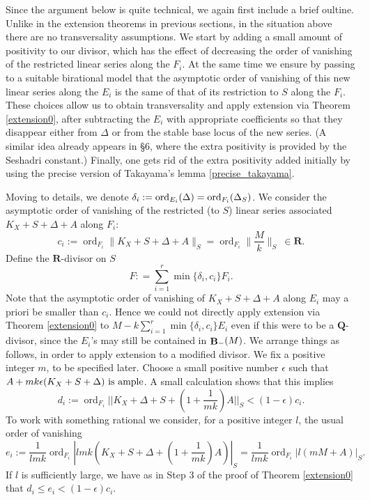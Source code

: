 \documentclass[11pt]{amsart}
\theoremstyle{plain}
\theoremstyle{definition}
\newcommand{\RR}{\mathbf{R}}
\newcommand{\QQ}{\mathbf{Q}}
\DeclareMathOperator{\ord}{ord}
\DeclareMathOperator{\BB}{{\bf B}}
\begin{document}
Since the argument below is quite  technical, we again first include a brief oultine. Unlike in the extension theorems in previous sections, in the situation above
there are no transversality assumptions. We start by adding a small amount of positivity to our divisor, which has the effect of decreasing the order 
of vanishing of the restricted linear series along the $F_i$. At the same time we ensure by passing to a suitable birational model that the 
asymptotic order of vanishing of this new linear series along the $E_i$ is the same of that  of its restriction to $S$ along the $F_i$. These choices allow us to 
obtain transversality and apply extension via Theorem \ref{extension0}, after subtracting the $E_i$ with appropriate coefficients so that they disappear either from 
$\Delta$ or from the stable base locus of the new series. (A similar idea already appears in \cite{el1} \S6,  where the extra positivity is provided by the Seshadri constant.)
Finally, one gets rid of the extra positivity added initially by using the precise version of Takayama's lemma \ref{precise_takayama}.


Moving to details, we denote $\delta_i : = {\rm ord}_{E_i} (\Delta) = {\rm ord}_{F_i} (\Delta_S)$.
We consider the asymptotic order of vanishing of the restricted (to $S$) linear series associated $K_X + S + \Delta + A$ along $F_i$:
$$c_i := \ord_{F_i} \parallel K_X + S + \Delta + A \parallel_S =  \ord_{F_i} \parallel \frac{M}{k} \parallel_S ~\in \RR.$$
Define the $\RR$-divisor on $S$
$$F: =  \sum_{i=1}^r \min \{\delta_i, c_i\} F_i.$$
Note that the asymptotic order of vanishing of $K_X +  S + \Delta + A$ along $E_i$ may 
a priori be smaller than $c_i$. Hence we could not directly apply extension via Theorem \ref{extension0} to $M - k \sum_{i=1}^r \min \{\delta_i, c_i\} E_i$ even if this were to be a 
$\QQ$-divisor, since the $E_i$'s may still be contained in $\BB_{-} (M)$. We arrange things as  follows, in order to apply extension to a modified divisor. We fix a positive integer $m$, to be specified  later. Choose a small positive 
number $\epsilon$ such that $A + mk\epsilon  (K_X +S + \Delta) {\rm~is ~ample}$.
A small calculation shows that this implies 
$$d_i := \ord_{F_i} ||K_X+\Delta +S +(1+\frac{1}{mk})A||_S < (1-\epsilon)c_i.$$
To work with something rational we consider, for a positive integer $l$, the usual order 
of vanishing
$$e_i :=\frac{1}{lmk}\ord_{F_i} |lmk(K_X+S+\Delta +(1+\frac{1}{mk}) A)|_S = 
\frac{1}{lmk}\ord_{F_i} |l(mM  + A)|_S.$$
If $l$ is sufficiently large, we have as in Step 3 of the proof of Theorem \ref{extension0}
that $d_i \le e_i < (1 - \epsilon) c_i$.
\end{document}
